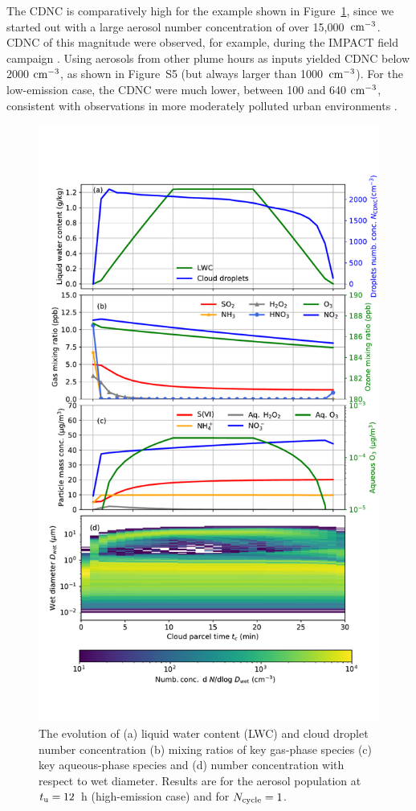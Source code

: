 \documentclass[edeposit,fullpage]{uiucthesis2009}
\begin{document}
The CDNC is comparatively high for the example shown in
  Figure~\ref{fig:cloud_env}, since we started out with a large
  aerosol number concentration of over 15,000~$\rm cm^{-3}$. CDNC of
  this magnitude were observed, for example, during the IMPACT field
  campaign \citep{brenguier2011cloud}.  Using aerosols from other plume
  hours as inputs yielded CDNC below 2000 $\rm cm^{-3}$, as shown in
  Figure~S5 (but always larger than 1000~$\rm cm^{-3}$). For the
  low-emission case, the CDNC were much lower, between 100 and 640 $\rm
  cm^{-3}$, consistent with observations in more moderately polluted
  urban environments \citep{ahmad2013long}.

\begin{figure}
    \centering
    \includegraphics[scale=0.50]{chap3_figs/fig4.pdf}
    \caption{The evolution of (a) liquid water content (LWC) and cloud
      droplet number concentration (b) mixing ratios of key gas-phase
      species (c) key aqueous-phase species and (d) number
      concentration with respect to wet diameter. Results are for the
      aerosol population at $t_{\rm u} =12$~h (high-emission
        case) and for $N_{\rm cycle}=1$.}
    \label{fig:cloud_env}
\end{figure}
\end{document}
